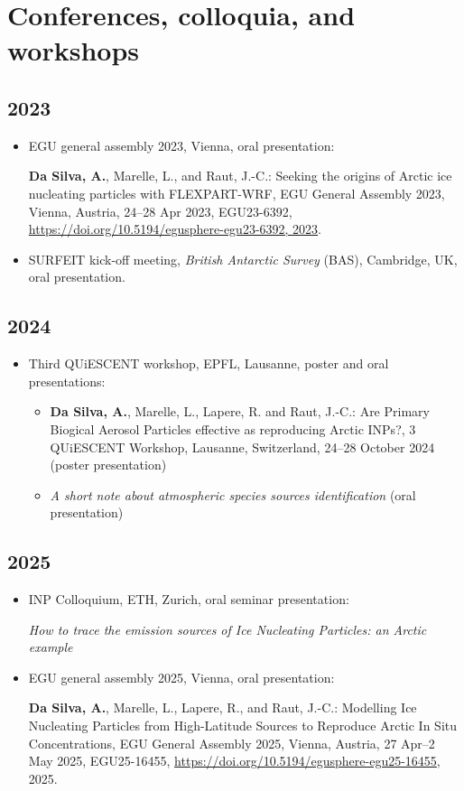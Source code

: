 \section*{Conferences, colloquia, and workshops}
    \subsection*{2023}
    \begin{itemize}
        \item EGU general assembly 2023, Vienna, oral presentation:

        \textbf{Da Silva, A.}, Marelle, L., and Raut, J.-C.: Seeking the origins of Arctic ice nucleating particles with FLEXPART-WRF, EGU General Assembly 2023, Vienna, Austria, 24–28 Apr 2023, EGU23-6392, \url{https://doi.org/10.5194/egusphere-egu23-6392, 2023}. 

        \item SURFEIT kick-off meeting, \textit{British Antarctic Survey} (BAS), Cambridge, UK, oral presentation.
    \end{itemize}

    \subsection*{2024}
    \begin{itemize}
        \item Third QUiESCENT workshop, EPFL, Lausanne, poster and oral presentations:
        \begin{itemize}
            \item \textbf{Da Silva, A.}, Marelle, L., Lapere, R. and Raut, J.-C.: Are Primary Biogical Aerosol Particles effective as reproducing Arctic INPs?, 3 QUiESCENT Workshop, Lausanne, Switzerland, 24–28 October 2024 (poster presentation)

            \item \textit{A short note about atmospheric species sources identification} (oral presentation)
        \end{itemize}
    \end{itemize}
    \subsection*{2025}
    \begin{itemize}
        \item INP Colloquium, ETH, Zurich, oral seminar presentation:

        \textit{How to trace the emission sources of Ice Nucleating Particles: an Arctic example}

        \item EGU general assembly 2025, Vienna, oral presentation:

            \textbf{Da Silva, A.}, Marelle, L., Lapere, R., and Raut, J.-C.: Modelling Ice Nucleating Particles from High-Latitude Sources to Reproduce Arctic In Situ Concentrations, EGU General Assembly 2025, Vienna, Austria, 27 Apr–2 May 2025, EGU25-16455, \url{https://doi.org/10.5194/egusphere-egu25-16455}, 2025. 
    \end{itemize}



